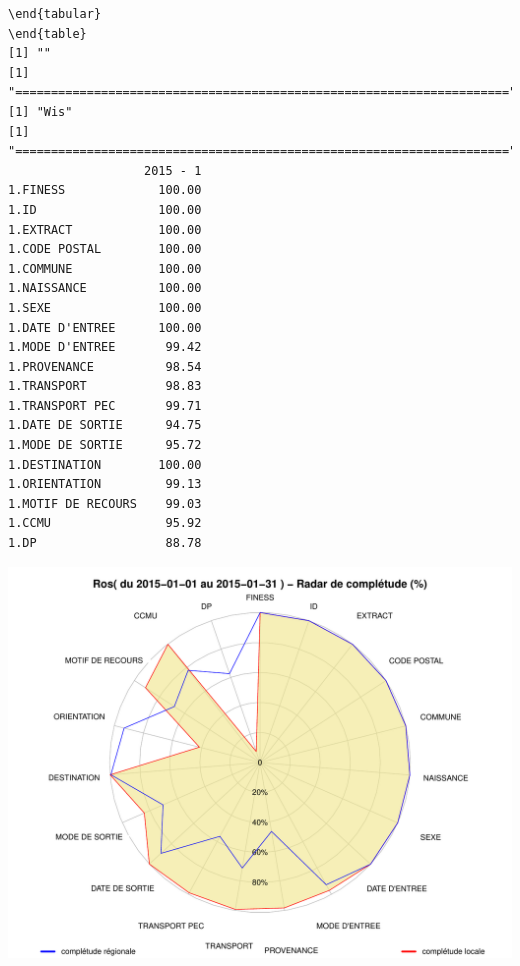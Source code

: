 \documentclass[]{article}
\begin{document}
\begin{verbatim}
\end{tabular} 
\end{table} 
[1] ""
[1] "====================================================================="
[1] "Wis"
[1] "====================================================================="
                   2015 - 1
1.FINESS             100.00
1.ID                 100.00
1.EXTRACT            100.00
1.CODE POSTAL        100.00
1.COMMUNE            100.00
1.NAISSANCE          100.00
1.SEXE               100.00
1.DATE D'ENTREE      100.00
1.MODE D'ENTREE       99.42
1.PROVENANCE          98.54
1.TRANSPORT           98.83
1.TRANSPORT PEC       99.71
1.DATE DE SORTIE      94.75
1.MODE DE SORTIE      95.72
1.DESTINATION        100.00
1.ORIENTATION         99.13
1.MOTIF DE RECOURS    99.03
1.CCMU                95.92
1.DP                  88.78
\end{verbatim}

\includegraphics{completude_files/figure-latex/finess-11.pdf}
\end{document}
